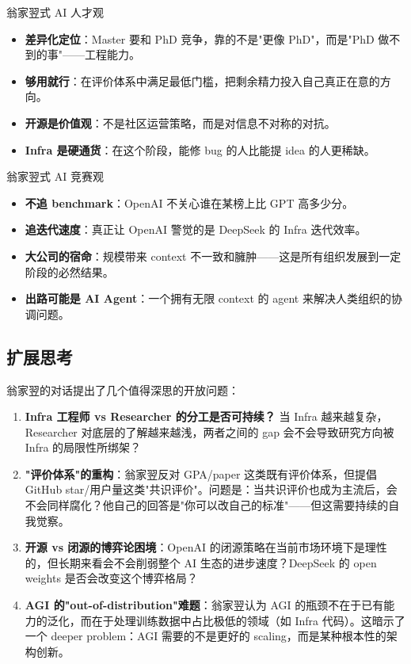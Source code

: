 \documentclass[a4paper]{article}
\begin{document}
\begin{importantbox}{翁家翌式 AI 人才观}

\begin{itemize}
\item \textbf{差异化定位}：Master 要和 PhD 竞争，靠的不是"更像 PhD"，而是"PhD 做不到的事"——工程能力。
\item \textbf{够用就行}：在评价体系中满足最低门槛，把剩余精力投入自己真正在意的方向。
\item \textbf{开源是价值观}：不是社区运营策略，而是对信息不对称的对抗。
\item \textbf{Infra 是硬通货}：在这个阶段，能修 bug 的人比能提 idea 的人更稀缺。
\end{itemize}
\end{importantbox}


\begin{importantbox}{翁家翌式 AI 竞赛观}

\begin{itemize}
\item \textbf{不追 benchmark}：OpenAI 不关心谁在某榜上比 GPT 高多少分。
\item \textbf{追迭代速度}：真正让 OpenAI 警觉的是 DeepSeek 的 Infra 迭代效率。
\item \textbf{大公司的宿命}：规模带来 context 不一致和臃肿——这是所有组织发展到一定阶段的必然结果。
\item \textbf{出路可能是 AI Agent}：一个拥有无限 context 的 agent 来解决人类组织的协调问题。
\end{itemize}
\end{importantbox}


\subsection{扩展思考}

翁家翌的对话提出了几个值得深思的开放问题：

\begin{enumerate}
\item \textbf{Infra 工程师 vs Researcher 的分工是否可持续？} 当 Infra 越来越复杂，Researcher 对底层的了解越来越浅，两者之间的 gap 会不会导致研究方向被 Infra 的局限性所绑架？
\item \textbf{"评价体系"的重构}：翁家翌反对 GPA/paper 这类既有评价体系，但提倡 GitHub star/用户量这类"共识评价"。问题是：当共识评价也成为主流后，会不会同样腐化？他自己的回答是"你可以改自己的标准"——但这需要持续的自我觉察。
\item \textbf{开源 vs 闭源的博弈论困境}：OpenAI 的闭源策略在当前市场环境下是理性的，但长期来看会不会削弱整个 AI 生态的进步速度？DeepSeek 的 open weights 是否会改变这个博弈格局？
\item \textbf{AGI 的"out-of-distribution"难题}：翁家翌认为 AGI 的瓶颈不在于已有能力的泛化，而在于处理训练数据中占比极低的领域（如 Infra 代码）。这暗示了一个 deeper problem：AGI 需要的不是更好的 scaling，而是某种根本性的架构创新。
\end{enumerate}
\end{document}
